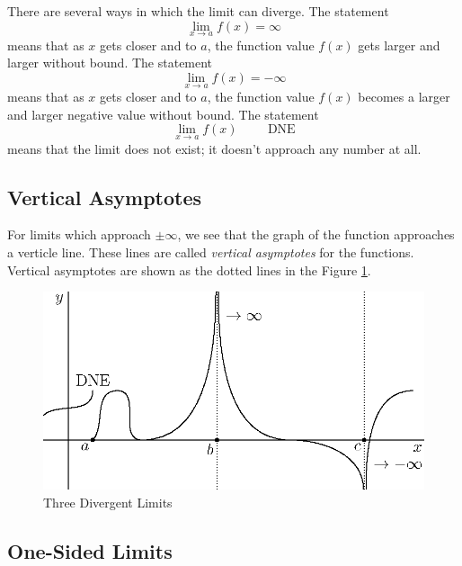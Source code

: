 \documentclass[fleqn]{report}
\begin{document}
There are several ways in which the limit can diverge. The
statement
\begin{equation*}
\lim_{x \rightarrow a} f(x) = \infty
\end{equation*}
means that as $x$ gets closer and to $a$, the function value
$f(x)$ gets larger and larger without bound. The statement
\begin{equation*}
\lim_{x \rightarrow a} f(x) = -\infty
\end{equation*}
means that as $x$ gets closer and to $a$, the function value
$f(x)$ becomes a larger and larger negative value without
bound. The statement
\begin{equation*}
\lim_{x \rightarrow a} f(x) \hspace{1cm} \text{DNE}
\end{equation*}
means that the limit does not exist; it doesn't approach any
number at all.

\subsection{Vertical Asymptotes}
\label{vertical-asymptotes}

For limits which approach $\pm \infty$, we see that the graph
of the function approaches a verticle line.  These lines are
called \emph{vertical asymptotes} for the functions.  Vertical
asymptotes are shown as the dotted lines in the Figure
\ref{figure-three-divergent-limits}.

\begin{figure}[t]
\centering
\includegraphics{figure19.eps}
\caption{Three Divergent Limits}
\label{figure-three-divergent-limits}
\end{figure}

\subsection{One-Sided Limits}
\label{one-sided}
\end{document}
